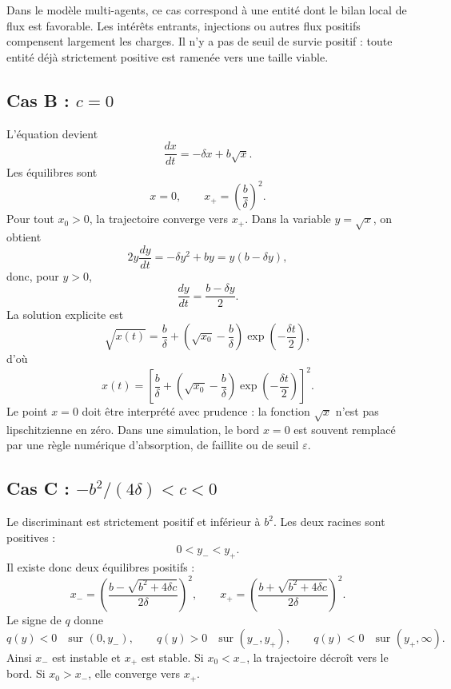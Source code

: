 \documentclass[11pt,a4paper]{article}
\begin{document}
Dans le modèle multi-agents, ce cas correspond à une entité dont le bilan local de flux est favorable. Les intérêts entrants, injections ou autres flux positifs compensent largement les charges. Il n'y a pas de seuil de survie positif : toute entité déjà strictement positive est ramenée vers une taille viable.

\subsection*{Cas B : \(c=0\)}

L'équation devient
\[
    \frac{dx}{dt}=-\delta x+b\sqrt{x}.
\]
Les équilibres sont
\[
    x=0,\qquad x_+=\left(\frac{b}{\delta}\right)^2.
\]
Pour tout \(x_0>0\), la trajectoire converge vers \(x_+\). Dans la variable \(y=\sqrt{x}\), on obtient
\[
    2y\frac{dy}{dt}
    =
    -\delta y^2+by
    =
    y(b-\delta y),
\]
donc, pour \(y>0\),
\[
    \frac{dy}{dt}
    =
    \frac{b-\delta y}{2}.
\]
La solution explicite est
\begin{equation}
    \sqrt{x(t)}
    =
    \frac{b}{\delta}
    +
    \left(\sqrt{x_0}-\frac{b}{\delta}\right)
    \exp\left(-\frac{\delta t}{2}\right),
    \label{eq:explicit_c0}
\end{equation}
d'où
\[
    x(t)
    =
    \left[
    \frac{b}{\delta}
    +
    \left(\sqrt{x_0}-\frac{b}{\delta}\right)
    \exp\left(-\frac{\delta t}{2}\right)
    \right]^2.
\]
Le point \(x=0\) doit être interprété avec prudence : la fonction \(\sqrt{x}\) n'est pas lipschitzienne en zéro. Dans une simulation, le bord \(x=0\) est souvent remplacé par une règle numérique d'absorption, de faillite ou de seuil \(\varepsilon\).

\subsection*{Cas C : \(-b^2/(4\delta)<c<0\)}

Le discriminant est strictement positif et inférieur à \(b^2\). Les deux racines sont positives :
\[
    0<y_-<y_+.
\]
Il existe donc deux équilibres positifs :
\[
    x_-=
    \left(
        \frac{b-\sqrt{b^2+4\delta c}}{2\delta}
    \right)^2,
    \qquad
    x_+=
    \left(
        \frac{b+\sqrt{b^2+4\delta c}}{2\delta}
    \right)^2.
\]
Le signe de \(q\) donne
\[
    q(y)<0 \quad \text{sur }(0,y_-),
    \qquad
    q(y)>0 \quad \text{sur }(y_-,y_+),
    \qquad
    q(y)<0 \quad \text{sur }(y_+,\infty).
\]
Ainsi \(x_-\) est instable et \(x_+\) est stable. Si \(x_0<x_-\), la trajectoire décroît vers le bord. Si \(x_0>x_-\), elle converge vers \(x_+\).
\end{document}
